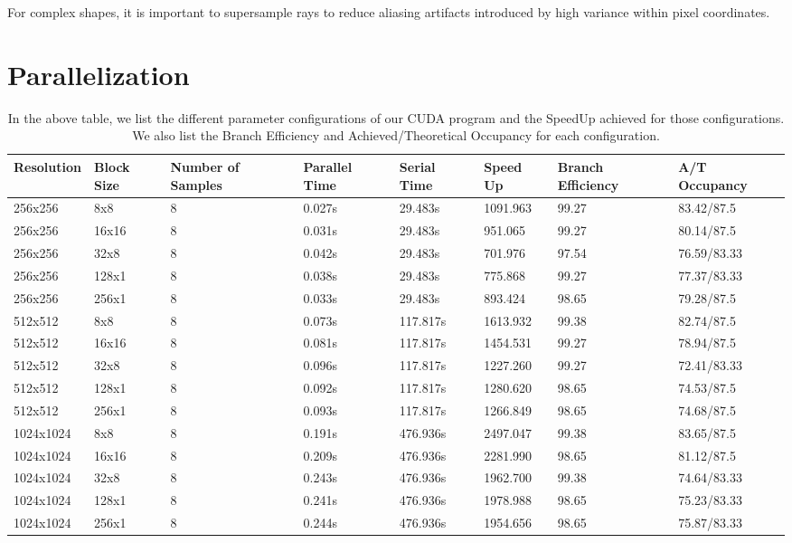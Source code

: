 \documentclass[sigconf, nonacm]{acmart}
\begin{document}
For complex shapes, it is important to supersample rays to reduce aliasing artifacts introduced by high variance within pixel coordinates.

\section{Parallelization}

\begin{table}[!htbp]
\begin{center}
    \begin{tabular}{ | l | l | l | l | l | l | l | l |}
    \hline
    \textbf{Resolution}  & \textbf{Block Size} & \textbf{Number of Samples} & \textbf{Parallel Time} & \textbf{Serial Time}  & \textbf{Speed Up} & \textbf{Branch Efficiency} & \textbf{A/T Occupancy} \\ \hline
    256x256	& 8x8	& 8	& 0.027s	& 29.483s &	1091.963	& 99.27	& 83.42/87.5  \\ \hline
    256x256	& 16x16	& 8	& 0.031s & 29.483s &	951.065	& 99.27	& 80.14/87.5  \\ \hline
    256x256	& 32x8	& 8	& 0.042s	& 29.483s &	701.976	& 97.54 & 76.59/83.33  \\ \hline
    256x256	& 128x1	& 8	& 0.038s	& 29.483s &	775.868	& 99.27	& 77.37/83.33  \\ \hline
    256x256	& 256x1	& 8	& 0.033s	& 29.483s &	893.424	& 98.65	& 79.28/87.5 \\ \hline
    512x512	& 8x8	& 8	& 0.073s	& 117.817s &	1613.932	& 99.38	& 82.74/87.5  \\ \hline
    512x512	& 16x16	& 8	& 0.081s	& 117.817s &	1454.531	& 99.27	& 78.94/87.5  \\ \hline
    512x512	& 32x8	& 8	& 0.096s	& 117.817s &	1227.260	& 99.27	& 72.41/83.33  \\ \hline
    512x512	& 128x1	& 8	& 0.092s	& 117.817s &	1280.620	& 98.65	& 74.53/87.5 \\ \hline
    512x512	& 256x1	& 8	& 0.093s	& 117.817s &	1266.849	& 98.65	& 74.68/87.5 \\ \hline
    1024x1024	& 8x8	& 8	& 0.191s	& 476.936s &	2497.047	& 99.38	& 83.65/87.5  \\ \hline
    1024x1024	& 16x16	& 8	& 0.209s	& 476.936s &	2281.990	& 98.65	& 81.12/87.5  \\ \hline
    1024x1024	& 32x8	& 8	& 0.243s	& 476.936s &	1962.700	& 99.38	& 74.64/83.33  \\ \hline
    1024x1024	& 128x1	& 8	& 0.241s	& 476.936s &	1978.988	& 98.65	& 75.23/83.33  \\ \hline
    1024x1024	& 256x1	& 8	& 0.244s	& 476.936s &	1954.656	& 98.65	& 75.87/83.33  \\ \hline
    \end{tabular}
    \begin{center}
    \caption{In the above table, we list the different parameter configurations of our CUDA program and the SpeedUp achieved for those configurations. We also list the Branch Efficiency and Achieved/Theoretical Occupancy for each configuration. }
    \end{center}
\end{center}
\end{table}
\end{document}
